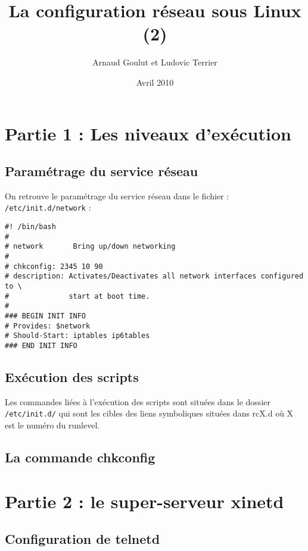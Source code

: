 \documentclass[12pt,a4paper,notitlepage]{article}
\begin{document}
\title{La configuration réseau sous Linux (2)}
\author{Arnaud Goulut et Ludovic Terrier}
\date{Avril 2010}
\maketitle



\thispagestyle{empty}




\section{Partie 1 : Les niveaux d'exécution}

\subsection{Paramétrage du service réseau}
On retrouve le paramétrage du service réseau dans le fichier : \texttt{/etc/init.d/network} :

\begin{lstlisting}
#! /bin/bash
#
# network       Bring up/down networking
#
# chkconfig: 2345 10 90
# description: Activates/Deactivates all network interfaces configured to \
#              start at boot time.
#
### BEGIN INIT INFO
# Provides: $network
# Should-Start: iptables ip6tables
### END INIT INFO\end{lstlisting}


\subsection{Exécution des scripts}

Les commandes liées à l'exécution des scripts sont situées dans le dossier \texttt{/etc/init.d/} qui sont les cibles des liens symboliques situées dans rcX.d où X est le numéro du runlevel.


\subsection{La commande chkconfig}



\section{Partie 2 : le super-serveur xinetd}
\subsection{Configuration de telnetd}
 
\end{document}
